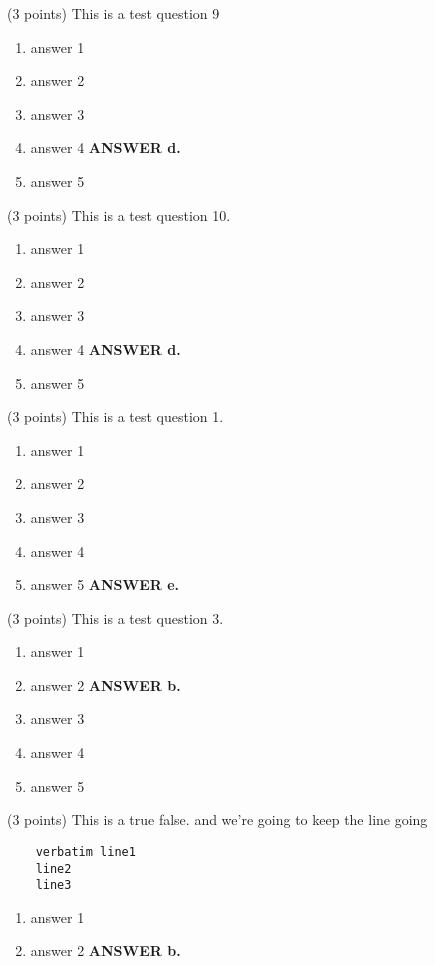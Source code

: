 \documentclass{article}
\newcommand{\ans}[1]{ \ifnum\showans=1 {\bf ANSWER #1.} \fi }
\begin{document}

\item (3 points) This is a test question 9
  \begin{enumerate}
  \item answer 1
  \item answer 2
  \item answer 3
  \item answer 4  \ans{d}
  \item answer 5
  \end{enumerate}

\item (3 points) This is a test question 10.
  \begin{enumerate}
  \item answer 1
  \item answer 2
  \item answer 3
  \item answer 4  \ans{d}
  \item answer 5
  \end{enumerate}

\item (3 points) This is a test question 1.
  \begin{enumerate}
  \item answer 1
  \item answer 2
  \item answer 3
  \item answer 4
  \item answer 5  \ans{e}
  \end{enumerate}

\item (3 points) This is a test question 3.
  \begin{enumerate}
  \item answer 1
  \item answer 2  \ans{b}
  \item answer 3
  \item answer 4
  \item answer 5
  \end{enumerate}

\item (3 points) This is a true false.
and we're going to keep the line going
\begin{verbatim}
    verbatim line1
    line2
    line3
\end{verbatim}
  \begin{enumerate}
  \item answer 1
  \item answer 2  \ans{b}
  \end{enumerate}
\end{document}
